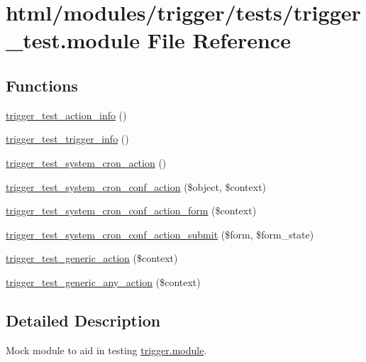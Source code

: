\hypertarget{trigger__test_8module}{
\section{html/modules/trigger/tests/trigger\_\-test.module File Reference}
\label{trigger__test_8module}
}
\subsection*{Functions}
\begin{DoxyCompactItemize}
\item 
\hyperlink{trigger__test_8module_aeadfec612e28d35f8f5fb79df39ca987}{trigger\_\-test\_\-action\_\-info} ()
\item 
\hyperlink{trigger__test_8module_a64b6a660e9aa002c247e7af9f09202a4}{trigger\_\-test\_\-trigger\_\-info} ()
\item 
\hyperlink{trigger__test_8module_a861d1c1fafd3ac6801b62db0b72734f2}{trigger\_\-test\_\-system\_\-cron\_\-action} ()
\item 
\hyperlink{trigger__test_8module_a07a525650437b2b848a3707fa1c522d0}{trigger\_\-test\_\-system\_\-cron\_\-conf\_\-action} (\$object, \$context)
\item 
\hyperlink{trigger__test_8module_a4df57ed2933911fabf0bd99bfea43b3e}{trigger\_\-test\_\-system\_\-cron\_\-conf\_\-action\_\-form} (\$context)
\item 
\hyperlink{trigger__test_8module_ab8ed1eb9ab249403641fa7680ffac112}{trigger\_\-test\_\-system\_\-cron\_\-conf\_\-action\_\-submit} (\$form, \$form\_\-state)
\item 
\hyperlink{trigger__test_8module_a7cb17b51e7178a36ba912bbe495f729a}{trigger\_\-test\_\-generic\_\-action} (\$context)
\item 
\hyperlink{trigger__test_8module_a7d16a0032e36971b0c1dab972b7e76ee}{trigger\_\-test\_\-generic\_\-any\_\-action} (\$context)
\end{DoxyCompactItemize}


\subsection{Detailed Description}
Mock module to aid in testing \hyperlink{trigger_8module}{trigger.module}. 

